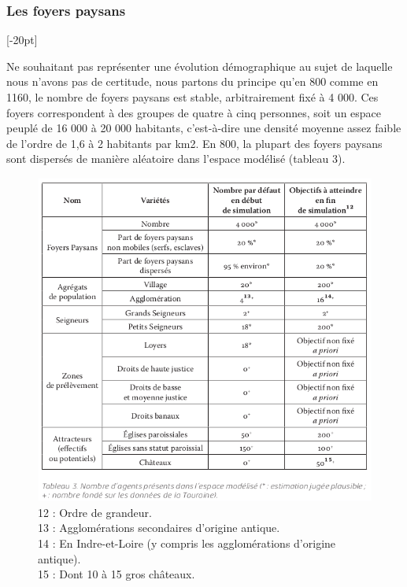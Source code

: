 \subsubsection{Les foyers paysans}[-20pt]

Ne souhaitant pas représenter une évolution démographique au sujet de laquelle nous n'avons pas de certitude, nous partons du principe qu'en 800 comme en 1160, le nombre de foyers paysans est stable, arbitrairement fixé à 4 000.
Ces foyers correspondent à des groupes de quatre à cinq personnes, soit un espace peuplé de 16 000 à 20 000 habitants, c'est-à-dire une densité moyenne assez faible de l'ordre de 1,6 à 2 habitants par km2.
En 800, la plupart des foyers paysans sont dispersés de manière aléatoire dans l'espace modélisé (tableau 3).

\begin{figure}[H]
	\centering
	\includegraphics[width=1\linewidth]{src/Chapitre_TMD/Tab3.png}
	\caption*{
		\small
		12 : Ordre de grandeur.\\
		13 : Agglomérations secondaires d’origine antique. \\
		14 : En Indre-et-Loire (y compris les agglomérations d’origine antique).\\
		15 : Dont 10 à 15 gros châteaux.
}
\end{figure}

